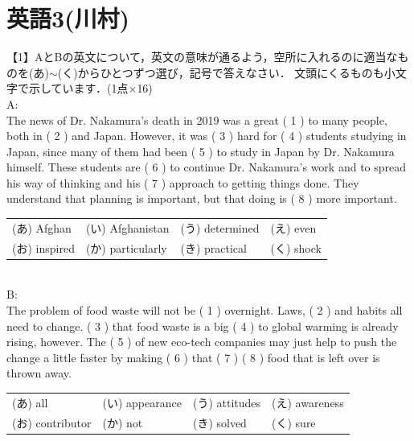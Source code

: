 \section{英語3(川村)}
\noindent 【1】AとBの英文について，英文の意味が通るよう，空所に入れるのに適当なものを(あ)$\sim$(く)からひとつずつ選び，記号で答えなさい．
文頭にくるものも小文字で示しています．(1点$\times$16)\\
A:\\
The news of Dr. Nakamura's death in 2019 was a great ( 1 ) to many people, both in ( 2 ) and Japan. 
However, it was ( 3 ) hard for ( 4 ) students studying in Japan, since many of them had been ( 5 ) to study in Japan by Dr. Nakamura himself. 
These students are ( 6 ) to continue Dr. Nakamura's work and to spread his way of thinking and his ( 7 ) approach to getting things done. 
They understand that planning is important, but that doing is ( 8 ) more important. 

\bigskip
  \begin{tabular}{llll}
  (あ) Afghan & (い) Afghanistan & (う) determined & (え) even\\
  (お) inspired & (か) particularly & (き) practical & (く) shock\\
  \end{tabular}
\bigskip\\
B:\\
The problem of food waste will not be ( 1 ) overnight. Laws, ( 2 ) and habits all need to change. 
( 3 ) that food waste is a big ( 4 ) to global warming is already rising, however.
The ( 5 ) of new eco-tech companies may just help to push the change a little faster by making ( 6 ) that ( 7 ) ( 8 ) food that is left over is thrown away. 

\bigskip
  \begin{tabular}{llll}
  (あ) all & (い) appearance & (う) attitudes & (え) awareness\\
  (お) contributor & (か) not & (き) solved & (く) sure\\
  \end{tabular}
\bigskip\bigskip

